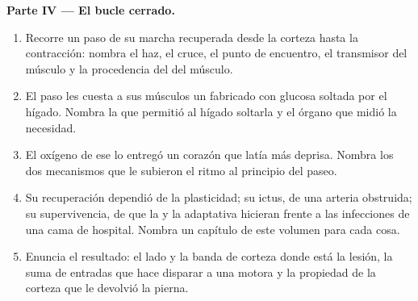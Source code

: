 \begin{problem}
\medskip
\noindent\textbf{Parte IV --- El bucle cerrado.}
\begin{enumerate}[resume]
  \item Recorre un paso de su marcha recuperada desde la corteza hasta
        la contracción: nombra el haz, el cruce, el punto de encuentro,
        el transmisor del músculo y la procedencia del  del músculo.
  \item El paso les cuesta a sus músculos un  fabricado con glucosa
        soltada por el hígado. Nombra la  que permitió al hígado
        soltarla y el órgano que midió la necesidad.
  \item El oxígeno de ese  lo entregó un corazón que latía más
        deprisa. Nombra los dos mecanismos que le subieron el ritmo al
        principio del paseo.
  \item Su recuperación dependió de la plasticidad; su ictus, de una
        arteria obstruida; su supervivencia, de que la 
        y la adaptativa hicieran frente a las infecciones de una cama
        de hospital. Nombra un capítulo de este volumen para cada cosa.
  \item Enuncia el resultado: el lado y la banda de corteza donde está
        la lesión, la suma de entradas que hace disparar a una 
        motora y la propiedad de la corteza que le devolvió la pierna.
\end{enumerate}
\end{problem}
